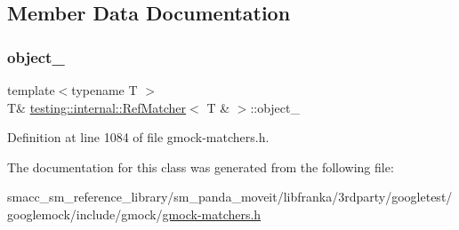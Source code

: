 \subsection{Member Data Documentation}
\mbox{\label{classtesting_1_1internal_1_1RefMatcher_3_01T_01_6_01_4_a459e1fb16e9279031436dbdf1fcce6bd}} 
\subsubsection{\texorpdfstring{object\+\_\+}{object\_}}
{\footnotesize\ttfamily template$<$typename T $>$ \\
T\& \hyperlink{classtesting_1_1internal_1_1RefMatcher}{testing\+::internal\+::\+Ref\+Matcher}$<$ T \& $>$\+::object\+\_\+\hspace{0.3cm}{\ttfamily [private]}}



Definition at line 1084 of file gmock-\/matchers.\+h.



The documentation for this class was generated from the following file\+:\begin{DoxyCompactItemize}
\item 
smacc\+\_\+sm\+\_\+reference\+\_\+library/sm\+\_\+panda\+\_\+moveit/libfranka/3rdparty/googletest/googlemock/include/gmock/\hyperlink{gmock-matchers_8h}{gmock-\/matchers.\+h}\end{DoxyCompactItemize}
